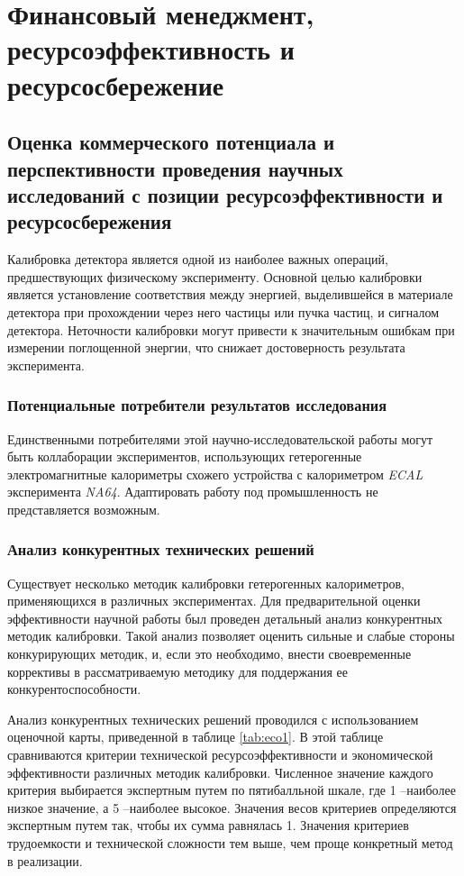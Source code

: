  \newpage
\section{Финансовый менеджмент, ресурсоэффективность и ресурсосбережение}  \label{ecochap:1}

\subsection{Оценка  коммерческого  потенциала  и  перспективности проведения научных исследований с позиции ресурсоэффективности и ресурсосбережения} \label{eco.1}

Калибровка детектора является одной из наиболее важных операций, предшествующих физическому эксперименту. Основной целью калибровки является  установление  соответствия  между  энергией,  выделившейся  в материале детектора при прохождении через него частицы или пучка частиц, и  сигналом  детектора.  Неточности  калибровки  могут  привести  к значительным ошибкам при измерении поглощенной энергии, что снижает достоверность результата эксперимента.

\subsubsection{Потенциальные потребители результатов исследования} \label{eco.1.1}

Единственными   потребителями   этой   научно-исследовательской работы   могут   быть   коллаборации   экспериментов,   использующих гетерогенные  электромагнитные  калориметры  схожего  устройства  с калориметром \textit{ECAL} эксперимента \textit{NA64}. Адаптировать  работу  под промышленность не представляется возможным.

\subsubsection{Анализ конкурентных технических решений} \label{eco.1.2}

Существует   несколько   методик   калибровки   гетерогенных калориметров,   применяющихся   в   различных   экспериментах.   Для предварительной  оценки  эффективности  научной  работы  был  проведен детальный  анализ  конкурентных  методик  калибровки. Такой  анализ позволяет оценить сильные и слабые стороны конкурирующих методик, и, если это необходимо, внести своевременные коррективы в рассматриваемую методику для поддержания ее конкурентоспособности. 

Анализ   конкурентных   технических   решений   проводился   с использованием оценочной карты, приведенной в таблице \ref{tab:eco1}. В этой таблице сравниваются    критерии    технической    ресурсоэффективности    и экономической  эффективности  различных  методик  калибровки.  Численное значение каждого критерия выбирается экспертным путем по пятибалльной шкале, где 1 –наиболее низкое значение, а 5 –наиболее высокое. Значения весов  критериев  определяются  экспертным  путем  так,  чтобы  их  сумма равнялась 1. Значения критериев трудоемкости и технической сложности тем выше, чем проще конкретный метод в реализации.

